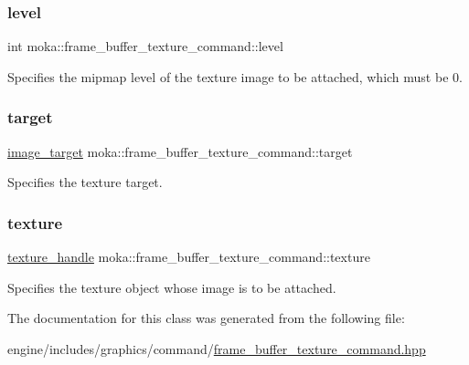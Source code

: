 \subsubsection{\texorpdfstring{level}{level}}
{\footnotesize\ttfamily int moka\+::frame\+\_\+buffer\+\_\+texture\+\_\+command\+::level}

Specifies the mipmap level of the texture image to be attached, which must be 0. \mbox{\label{classmoka_1_1frame__buffer__texture__command_ac8ac280263dfea329a3a0d0d7650a802}} 
\subsubsection{\texorpdfstring{target}{target}}
{\footnotesize\ttfamily \mbox{\hyperlink{namespacemoka_a6f402ae62a72ce17ff73fa94d526800e}{image\+\_\+target}} moka\+::frame\+\_\+buffer\+\_\+texture\+\_\+command\+::target}

Specifies the texture target. \mbox{\label{classmoka_1_1frame__buffer__texture__command_ac6986f87b2adb0c62e14f4b4989a19ff}} 
\subsubsection{\texorpdfstring{texture}{texture}}
{\footnotesize\ttfamily \mbox{\hyperlink{structmoka_1_1texture__handle}{texture\+\_\+handle}} moka\+::frame\+\_\+buffer\+\_\+texture\+\_\+command\+::texture}

Specifies the texture object whose image is to be attached. 

The documentation for this class was generated from the following file\+:\begin{DoxyCompactItemize}
\item 
engine/includes/graphics/command/\mbox{\hyperlink{frame__buffer__texture__command_8hpp}{frame\+\_\+buffer\+\_\+texture\+\_\+command.\+hpp}}\end{DoxyCompactItemize}
